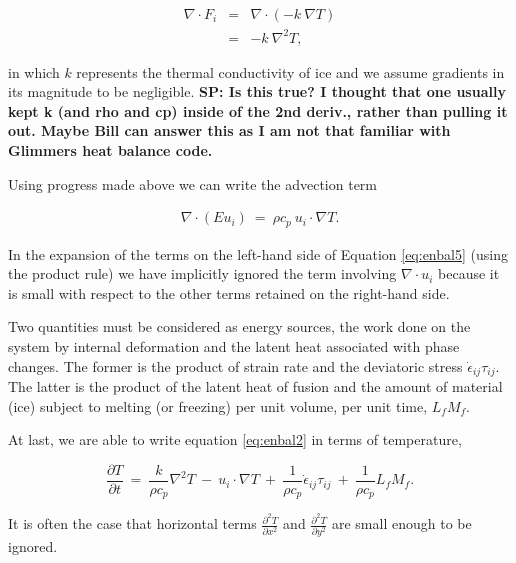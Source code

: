 \begin{equation}
\begin{matrix}
\nabla \cdot F_{i}&=&\nabla \cdot \left( -k ~\nabla T  \right) \\
&=&-k~\nabla^{2}T,
\end{matrix}
\label{eq:enbal4}
\end{equation}

in which $k$ represents the thermal conductivity of ice and we assume
gradients in its magnitude to be negligible. 
\textbf{SP: Is this true? I thought that one usually kept k (and rho and cp) inside of the 2nd deriv., rather than pulling it out. Maybe Bill can answer this as I am not that familiar with Glimmers heat balance code.}

Using progress made above we can write the advection term

\begin{equation}
\begin{matrix}
\nabla \cdot \left(E u_{i} \right)~=~\rho c_{p}~ u_{i} \cdot \nabla T. 
\end{matrix}
\label{eq:enbal5}
\end{equation}

In the expansion of the terms on the left-hand side of Equation \eqref{eq:enbal5} (using the product rule) we 
have implicitly ignored the term involving $\nabla \cdot u_{i}$ because it is small with respect to the other terms
retained on the right-hand side.

Two quantities must be considered as energy sources, the work done on
the system by internal deformation and the latent heat associated with
phase changes. The former is the product of strain rate and the
deviatoric stress $\dot{\epsilon}_{ij} \tau_{ij}$. The latter is the
product of the latent heat of fusion and the amount of material (ice) subject
to melting (or freezing) per unit volume, per unit time, $L_{f}M_{f}$.

At last, we are able to write equation \eqref{eq:enbal2} in terms of temperature,

\begin{equation}
\frac{\partial T}{\partial t}~=~\frac{k}{\rho c_{p}} \nabla^{2}T~-~u_{i}\cdot \nabla T~+~\frac{1}{\rho c_{p}} \dot{\epsilon}_{ij} \tau_{ij} ~+~\frac{1}{\rho c_{p}} L_{f} M_{f}.
\label{eq:enbal6}
\end{equation}

It is often the case that horizontal terms
$\frac{\partial^{2} T}{\partial x^{2}}$ and
$\frac{\partial^{2} T}{\partial y^{2}}$ are small enough to be ignored.
